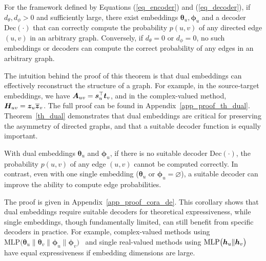 \begin{theorem}\label{th_dual}
For the framework defined by Equations (\ref{eq_encoder}) and (\ref{eq_decoder}), if ${d_{\theta}}, {d_{\phi}} > 0$ and sufficiently large, there exist embeddings ${\bm \theta}_u, {\bm \phi}_u$ and a decoder $\mathrm{Dec}(\cdot)$ that can correctly compute the probability $p(u,v)$ of any directed edge $(u,v)$ in an arbitrary graph. Conversely, if ${d_{\theta}} = 0$ or ${d_{\phi}} = 0$, no such embeddings or decoders can compute the correct probability of any edges in an arbitrary graph.
\end{theorem}
The intuition behind the proof of this theorem is that dual embeddings can effectively reconstruct the structure of a graph. For example, in the source-target embeddings, we have ${\bm{A}}_{uv} = {\bm{s}}_u^{\top}{\bm{t}}_v$, and in the complex-valued method, ${\bm{H}}_{uv} = {\bm{z}}_u \overline{{\bm{z}}}_v$. The full proof can be found in Appendix~\ref{app_proof_th_dual}. Theorem~\ref{th_dual} demonstrates that dual embeddings are critical for preserving the asymmetry of directed graphs, and that a suitable decoder function is equally important. %
\begin{corollary}\label{coro_de}
With dual embeddings $\bm{\theta}_u$ and $\bm{\phi}_u$, if there is no suitable decoder $\mathrm{Dec(\cdot)}$, the probability $p(u,v)$ of any edge $(u,v)$ cannot be computed correctly. In contrast, even with one single embedding ($\bm{\theta}_u$ or $\bm{\phi}_u = \varnothing$), a suitable decoder can improve the ability to compute edge probabilities.
\end{corollary}
The proof is given in Appendix~\ref{app_proof_cora_de}. This corollary shows that dual embeddings require suitable decoders for theoretical expressiveness, while single embeddings, though fundamentally limited, can still benefit from specific decoders in practice. For example, complex-valued methods using $\mathrm{MLP}\bigl({\bm\theta}_u \|{\bm\theta}_v \|\bm{\phi}_u \|\bm{\phi}_v\bigr)$~\cite{magnet} and single real-valued methods using $\mathrm{MLP}\bigl({\bm{h}}_u \| {\bm{h}}_v\bigr)$~\cite{dpyg} have equal expressiveness if embedding dimensions are large.


